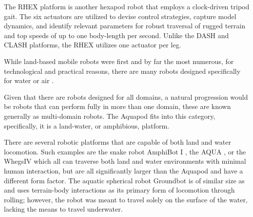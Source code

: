 		The RHEX platform \cite{Saranli2001a} is another hexapod robot that employs a clock-driven tripod gait. The six actuators are utilized to devise control strategies, capture model dynamics, and identify relevant parameters for robust traversal of rugged terrain and top speeds of up to one body-length per second. Unlike the DASH and CLASH platforms, the RHEX utilizes one actuator per leg. 








		While land-based mobile robots were first and by far the most numerous, for technological and practical reasons, there are many robots designed specifically for water \cite{Villanueva2013} \cite{Yu2018} or air \cite{Neumann2012} \cite{Morton2013}.  

		Given that there are robots designed for all domains, a natural progression would be robots that can perform fully in more than one domain, these are known generally as multi-domain robots. The Aquapod fits into this category, specifically, it is a land-water, or amphibious, platform. 

		There are several robotic platforms that are capable of both land and water locomotion.  Such examples are the snake robot AmphiBot I \cite{Crespi2005a}, the AQUA \cite{Dudek2007}, or the Whegs\texttrademark IV \cite{Boxerbaum2005} which all can traverse both land and water environments with minimal human interaction, but are all significantly larger than the Aquapod and have a different form factor. The aquatic spherical robot Groundbot \cite{Kaznov2010} is of similar size as and uses terrain-body interactions as its primary form of locomotion through rolling; however, the robot was meant to travel solely on the surface of the water, lacking the means to travel underwater. 

